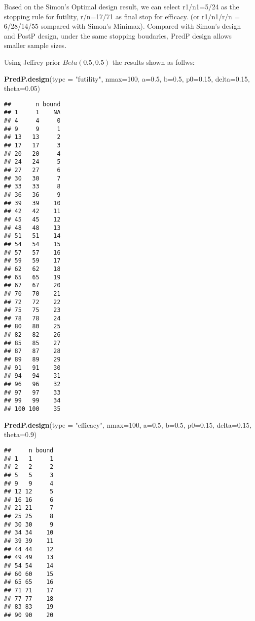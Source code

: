 \documentclass[]{article}
\newenvironment{Shaded}{\begin{snugshade}}{\end{snugshade}}
\newcommand{\KeywordTok}[1]{\textcolor[rgb]{0.13,0.29,0.53}{\textbf{{#1}}}}
\newcommand{\DataTypeTok}[1]{\textcolor[rgb]{0.13,0.29,0.53}{{#1}}}
\newcommand{\DecValTok}[1]{\textcolor[rgb]{0.00,0.00,0.81}{{#1}}}
\newcommand{\FloatTok}[1]{\textcolor[rgb]{0.00,0.00,0.81}{{#1}}}
\newcommand{\StringTok}[1]{\textcolor[rgb]{0.31,0.60,0.02}{{#1}}}
\newcommand{\NormalTok}[1]{{#1}}
\begin{document}
Based on the Simon's Optimal design result, we can select r1/n1=5/24 as
the stopping rule for futility, r/n=17/71 as final stop for efficacy.
(or r1/n1/r/n = 6/28/14/55 sompared with Simon's Minimax). Compared with
Simon's design and PostP design, under the same stopping boudaries,
PredP design allows smaller sample sizes.

Using Jeffrey prior \(Beta(0.5,0.5)\) the results shown as follws:

\begin{Shaded}
\begin{Highlighting}[]
\KeywordTok{PredP.design}\NormalTok{(}\DataTypeTok{type =} \StringTok{"futility"}\NormalTok{, }\DataTypeTok{nmax=}\DecValTok{100}\NormalTok{, }\DataTypeTok{a=}\FloatTok{0.5}\NormalTok{, }\DataTypeTok{b=}\FloatTok{0.5}\NormalTok{, }\DataTypeTok{p0=}\FloatTok{0.15}\NormalTok{, }\DataTypeTok{delta=}\FloatTok{0.15}\NormalTok{, }\DataTypeTok{theta=}\FloatTok{0.05}\NormalTok{)}
\end{Highlighting}
\end{Shaded}

\begin{verbatim}
##       n bound
## 1     1    NA
## 4     4     0
## 9     9     1
## 13   13     2
## 17   17     3
## 20   20     4
## 24   24     5
## 27   27     6
## 30   30     7
## 33   33     8
## 36   36     9
## 39   39    10
## 42   42    11
## 45   45    12
## 48   48    13
## 51   51    14
## 54   54    15
## 57   57    16
## 59   59    17
## 62   62    18
## 65   65    19
## 67   67    20
## 70   70    21
## 72   72    22
## 75   75    23
## 78   78    24
## 80   80    25
## 82   82    26
## 85   85    27
## 87   87    28
## 89   89    29
## 91   91    30
## 94   94    31
## 96   96    32
## 97   97    33
## 99   99    34
## 100 100    35
\end{verbatim}

\begin{Shaded}
\begin{Highlighting}[]
\KeywordTok{PredP.design}\NormalTok{(}\DataTypeTok{type =} \StringTok{"efficacy"}\NormalTok{, }\DataTypeTok{nmax=}\DecValTok{100}\NormalTok{, }\DataTypeTok{a=}\FloatTok{0.5}\NormalTok{, }\DataTypeTok{b=}\FloatTok{0.5}\NormalTok{, }\DataTypeTok{p0=}\FloatTok{0.15}\NormalTok{, }\DataTypeTok{delta=}\FloatTok{0.15}\NormalTok{, }\DataTypeTok{theta=}\FloatTok{0.9}\NormalTok{)}
\end{Highlighting}
\end{Shaded}

\begin{verbatim}
##     n bound
## 1   1     1
## 2   2     2
## 5   5     3
## 9   9     4
## 12 12     5
## 16 16     6
## 21 21     7
## 25 25     8
## 30 30     9
## 34 34    10
## 39 39    11
## 44 44    12
## 49 49    13
## 54 54    14
## 60 60    15
## 65 65    16
## 71 71    17
## 77 77    18
## 83 83    19
## 90 90    20
\end{verbatim}
\end{document}
